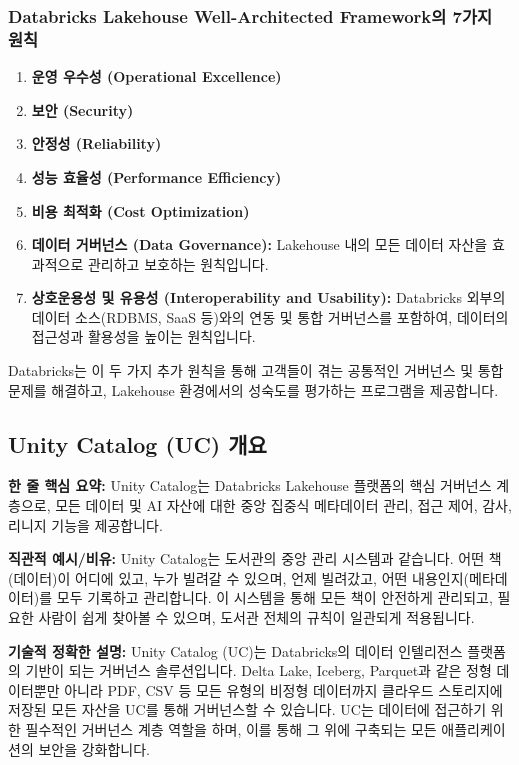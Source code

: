\documentclass[11pt,a4paper]{article}
\theoremstyle{definition}
\begin{document}
\subsubsection*{Databricks Lakehouse Well-Architected Framework의 7가지 원칙}
\begin{enumerate}
    \item \textbf{운영 우수성 (Operational Excellence)}
    \item \textbf{보안 (Security)}
    \item \textbf{안정성 (Reliability)}
    \item \textbf{성능 효율성 (Performance Efficiency)}
    \item \textbf{비용 최적화 (Cost Optimization)}
    \item \textbf{데이터 거버넌스 (Data Governance):} Lakehouse 내의 모든 데이터 자산을 효과적으로 관리하고 보호하는 원칙입니다.
    \item \textbf{상호운용성 및 유용성 (Interoperability and Usability):} Databricks 외부의 데이터 소스(RDBMS, SaaS 등)와의 연동 및 통합 거버넌스를 포함하여, 데이터의 접근성과 활용성을 높이는 원칙입니다.
\end{enumerate}
Databricks는 이 두 가지 추가 원칙을 통해 고객들이 겪는 공통적인 거버넌스 및 통합 문제를 해결하고, Lakehouse 환경에서의 성숙도를 평가하는 프로그램을 제공합니다.

\newpage
\subsection*{Unity Catalog (UC) 개요}

\begin{keyconceptbox}
\textbf{한 줄 핵심 요약:} Unity Catalog는 Databricks Lakehouse 플랫폼의 핵심 거버넌스 계층으로, 모든 데이터 및 AI 자산에 대한 중앙 집중식 메타데이터 관리, 접근 제어, 감사, 리니지 기능을 제공합니다.
\end{keyconceptbox}

\textbf{직관적 예시/비유:}
Unity Catalog는 도서관의 중앙 관리 시스템과 같습니다. 어떤 책(데이터)이 어디에 있고, 누가 빌려갈 수 있으며, 언제 빌려갔고, 어떤 내용인지(메타데이터)를 모두 기록하고 관리합니다. 이 시스템을 통해 모든 책이 안전하게 관리되고, 필요한 사람이 쉽게 찾아볼 수 있으며, 도서관 전체의 규칙이 일관되게 적용됩니다.

\textbf{기술적 정확한 설명:}
Unity Catalog (UC)는 Databricks의 데이터 인텔리전스 플랫폼의 기반이 되는 거버넌스 솔루션입니다. Delta Lake, Iceberg, Parquet과 같은 정형 데이터뿐만 아니라 PDF, CSV 등 모든 유형의 비정형 데이터까지 클라우드 스토리지에 저장된 모든 자산을 UC를 통해 거버넌스할 수 있습니다. UC는 데이터에 접근하기 위한 필수적인 거버넌스 계층 역할을 하며, 이를 통해 그 위에 구축되는 모든 애플리케이션의 보안을 강화합니다.
\end{document}
